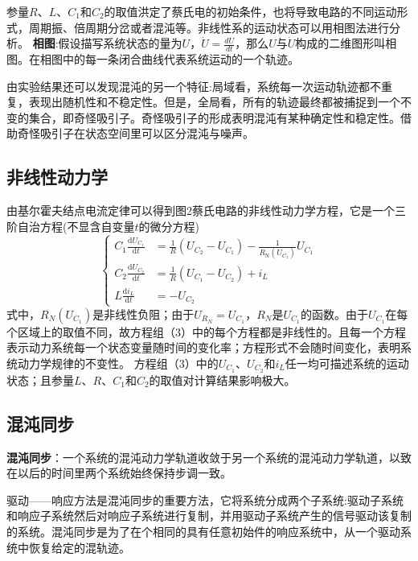 \documentclass[UTF8]{ctexart}
\begin{document}
\begin{multicols}{2}
参量$R$、$L$、$C_1$和$C_2$的取值洪定了蔡氏电的初始条件，也将导致电路的不同运动形式，周期振、倍周期分岔或者混沌等。非线性系的运动状态可以用相图法进行分析。
\newline\textbf{相图}:假设描写系统状态的量为$U$，$\dot{U}=\frac{dU}{dt}$，那么$U$与$\dot{U}$构成的二维图形叫相图。在相图中的每一条闭合曲线代表系统运动的一个轨迹。

由实验结果还可以发现混沌的另一个特征:局域看，系统每一次运动轨迹都不重复，表现出随机性和不稳定性。但是，全局看，所有的轨迹最终都被捕捉到一个不变的集合，即奇怪吸引子。奇怪吸引子的形成表明混沌有某种确定性和稳定性。借助奇怪吸引子在状态空间里可以区分混沌与噪声。

\subsection{非线性动力学}
由基尔霍夫结点电流定律可以得到图2蔡氏电路的非线性动力学方程，它是一个三阶自治方程(不显含自变量$t$的微分方程)
\begin{equation}
\left\{\begin{aligned} C_{1} \frac{\mathrm{d} U_{C_{1}}}{\mathrm{d} t} &=\frac{1}{R}\left(U_{C_{2}}-U_{C_{1}}\right)-\frac{1}{R_{\mathrm{N}}\left(U_{C_{1}}\right)} U_{C_{1}} \\ C_{2} \frac{\mathrm{d} U_{C_{2}}}{\mathrm{d} t} &=\frac{1}{R}\left(U_{C_{1}}-U_{C_{2}}\right)+i_{L} \\ L \frac{\mathrm{d} i_{L}}{\mathrm{d} t} &=-U_{C_{2}} \end{aligned}\right.
\end{equation}
式中，$R_N(U_{C_1})$是非线性负阻；由于$U_{R_N}=U_{C_1}$，$R_N$是$U_{C_1}$的函数。由于$U_{C_1}$在每个区域上的取值不同，故方程组（3）中的每个方程都是非线性的。且每一个方程表示动力系统每一个状态变量随时间的变化率；方程形式不会随时间变化，表明系统动力学规律的不变性。
方程组（3）中的$U_{C_{1}}$、$U_{C_{2}}$和$i_{L}$任一均可描述系统的运动状态；且参量$L$、$R$、$C_1$和$C_2$的取值对计算结果影响极大。

\subsection{混沌同步}
\textbf{混沌同步}：一个系统的混沌动力学轨道收敛于另一个系统的混沌动力学轨道，以致在以后的时间里两个系统始终保持步调一致。

驱动——响应方法是混沌同步的重要方法，它将系统分成两个子系统:驱动子系统和响应子系统然后对响应子系统进行复制，并用驱动子系统产生的信号驱动该复制的系统。混沌同步是为了在个相同的具有任意初始件的响应系统中，从一个驱动系统中恢复给定的混轨迹。


\end{multicols}
\end{document}
